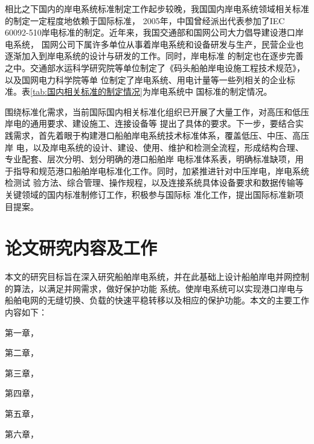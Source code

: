 相比之下国内的岸电系统标准制定工作起步较晚，我国国内岸电系统领域相关标准的制定一定程度地依赖于国际标准\cite{SP4}，
2005年，中国曾经派出代表参加了IEC 60092-510岸电标准的制定。近年来，我国交通部和国网公司大力倡导建设港口岸电系统，
国网公司下属许多单位从事着岸电系统和设备研发与生产，民营企业也逐渐加入到岸电系统的设计与研发的工作。同时，岸电标准
的制定也在逐步完善之中。交通部水运科学研究院等单位制定了《码头船舶岸电设施工程技术规范》，以及国网电力科学院等单
位制定了岸电系统、用电计量等一些列相关的企业标准\cite{SP14}。表\ref{tab:国内相关标准的制定情况}为岸电系统中
国标准的制定情况。

\begin{table}[!htp]
	\centering
	\caption[国内相关标准的制定情况]{国内相关标准的制定情况}
	\label{tab:国内相关标准的制定情况}
\end{table}

围绕标准化需求，当前国际国内相关标准化组织已开展了大量工作，对高压和低压岸电的通用要求、建设施工、连接设备等
提出了具体的要求。下一步，要结合实践需求，首先着眼于构建港口船舶岸电系统技术标准体系，覆盖低压、中压、高压岸
电，以及岸电系统的设计、建设、使用、维护和检测全流程，形成结构合理、专业配套、层次分明、划分明确的港口船舶岸
电标准体系表，明确标准缺项，用于指导和规范港口船舶岸电标准化工作。同时，加紧推进针对中压岸电，岸电系统检测试
验方法、综合管理、操作规程，以及连接系统具体设备要求和数据传输等关键领域的国内标准制修订工作，积极参与国际标
准化工作，提出国际标准新项目提案\cite{SP18}。

\section{论文研究内容及工作}
本文的研究目标旨在深入研究船舶岸电系统，并在此基础上设计船舶岸电并网控制的算法，以满足并网需求，做好保护功能
系统。使岸电系统可以实现港口岸电与船舶电网的无缝切换、负载的快速平稳转移以及相应的保护功能。本文的主要工作内容如下：

第一章，

第二章，

第三章，

第四章，

第五章，

第六章，


